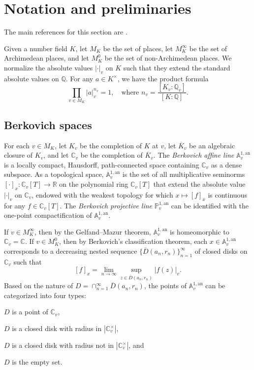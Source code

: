 \documentclass[11pt]{amsart}
\numberwithin{equation}{section}
\theoremstyle{plain}
\theoremstyle{definition}
\theoremstyle{remark}
\newcommand{\A}{\mathbb A}
\newcommand{\C}{\mathbb C}
\newcommand{\PP}{\mathbb P}
\newcommand{\Q}{\mathbb Q}
\newcommand{\R}{\mathbb R}
\newcommand{\an}{\mathrm{an}}
\renewcommand{\bar}{\overline}
\begin{document}
\section{Notation and preliminaries}\label{sec2}

The main references for this section are \cite{BR2,BD1,FRL,Fi}.

Given a number field $K$, let $M_{K}$ be the set of places, let
$M_{K}^{\infty}$ be the set of Archimedean places, and let $M_{K}^{0}$
be the set of non-Archimedean places. We normalize the absolute values
$|\cdot|_{v}$ on $K$ such that they extend the standard absolute
values on $\Q$. For any $a\in K^{\times}$, we have the product
formula
\[
\prod_{v\in M_{K}}|a|_{v}^{n_{v}}=1,\quad\text{where }n_{v}=\frac{[K_{v}:\Q_{v}]}{[K:\Q]}.
\]


\subsection{Berkovich spaces}\label{sec2.1}

For each $v\in M_{K}$, let $K_{v}$ be the completion of $K$ at $v$,
let $\bar{K}_{v}$ be an algebraic closure of $K_{v}$, and let $\C_{v}$
be the completion of $\bar{K}_{v}$. The \textit{Berkovich affine line}
$\A_{v}^{1,\an}$ is a locally compact, Hausdorff, path-connected space
containing $\C_{v}$ as a dense subspace. As a topological space,
$\A_{v}^{1,\an}$ is the set of all multiplicative seminorms
$[\cdot]_{x}\colon\C_{v}[T]\to\R$ on the polynomial ring $\C_{v}[T]$
that extend the absolute value $|\cdot|_{v}$ on $\C_{v}$, endowed with
the weakest topology for which $x\mapsto[f]_{x}$ is continuous for any
$f\in\C_{v}[T]$.  The \textit{Berkovich projective line}
$\PP_{v}^{1,\an}$ can be identified with the one-point
compactification of $\A_{v}^{1,\an}$.

If $v\in M_{K}^{\infty}$, then by the Gelfand--Mazur theorem,
$\A_{v}^{1,\an}$ is homeomorphic to $\C_{v}=\C$.
If $v\in M_{K}^{0}$, then by Berkovich\textquoteright s classification
theorem, each $x\in\A_{v}^{1,\an}$ corresponds to a
decreasing nested sequence $\{\overline{D}(a_{n},r_{n})\}_{n=1}^{\infty}$
of closed disks on $\C_{v}$ such that
\[
[f]_{x}=\lim_{n\to\infty}\sup_{z\in\overline{D}(a_{n},r_{n})}|f(z)|_{v}.
\]
Based on the nature of $D=\cap_{n=1}^{\infty}\overline{D}(a_{n},r_{n})$,
the points of $\A_{v}^{1,\an}$ can be categorized into
four types: \begin{enumerate*}[label=(\Roman*)]\item $D$ is a point of $\C_{v}$, \item $D$ is
a closed disk with radius in $|\C_{v}^{\times}|$, \item $D$
is a closed disk with radius not in $|\C_{v}^{\times}|$,
and \item $D$ is the empty set.\end{enumerate*}
\end{document}
